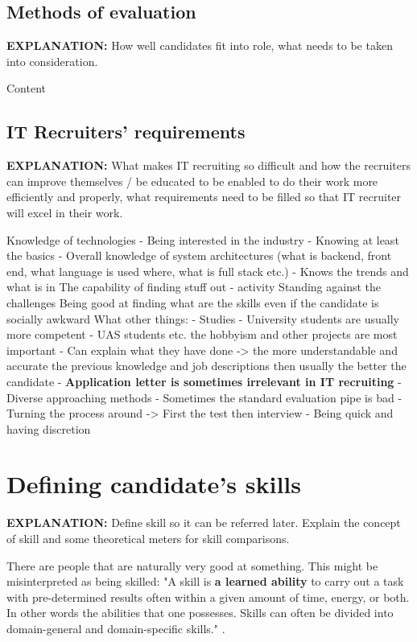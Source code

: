 \documentclass[11pt,a4paper,oneside,article]{memoir}
\begin{document}
\subsection{Methods of evaluation}
\textbf{EXPLANATION:} How well candidates fit into role, what needs to be taken into consideration.

Content

\subsection{IT Recruiters' requirements}
\textbf{EXPLANATION:} What makes IT recruiting so difficult and how the recruiters can improve themselves / be educated to be enabled to do their work more efficiently and properly, what requirements need to be filled so that IT recruiter will excel in their work.

Knowledge of technologies
- Being interested in the industry
- Knowing at least the basics
- Overall knowledge of system architectures (what is backend, front end, what language is used where, what is full stack etc.)
- Knows the trends and what is in
The capability of finding stuff out
- activity
Standing against the challenges
Being good at finding what are the skills even if the candidate is socially awkward
What other things:
- Studies
    - University students are usually more competent
    - UAS students etc. the hobbyism and other projects are most important
- Can explain what they have done -> the more understandable and accurate the previous knowledge and job descriptions then usually the better the candidate
- \textbf{Application letter is sometimes irrelevant in IT recruiting}
- Diverse approaching methods
   - Sometimes the standard evaluation pipe is bad
   - Turning the process around -> First the test then interview
- Being quick and having discretion



\section{Defining candidate's skills}
\textbf{EXPLANATION:} Define skill so it can be referred later. Explain the concept of skill and some theoretical meters for skill comparisons.

There are people that are naturally very good at something. This might be misinterpreted as being skilled: "A skill is \textbf{a learned ability} to carry out a task with pre-determined results often within a given amount of time, energy, or both. In other words the abilities that one possesses. Skills can often be divided into domain-general and domain-specific skills." \cite[p. ~4]{howland:book}.
\end{document}

